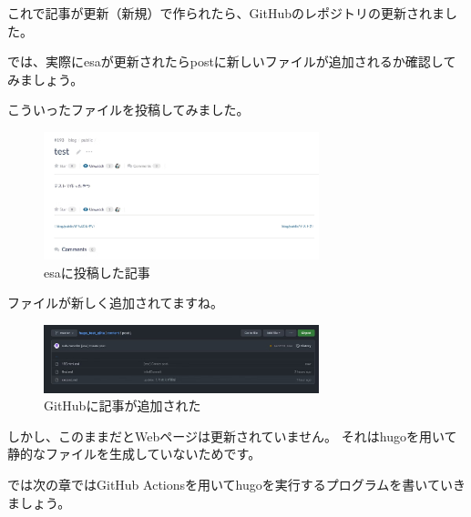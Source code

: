   これで記事が更新（新規）で作られたら、GitHubのレポジトリの更新されました。

  では、実際にesaが更新されたらpostに新しいファイルが追加されるか確認してみましょう。

  こういったファイルを投稿してみました。

  \begin{figure}[H]
    \centering
    \includegraphics[width=8cm]{./image/02-chap7/esa-posted.png}
    \caption{esaに投稿した記事 }
    \label{chap7-esa-posted-image}
  \end{figure}

  ファイルが新しく追加されてますね。

  \begin{figure}[H]
    \centering
    \includegraphics[width=8cm]{./image/02-chap7/github-upload-image.png}
    \caption{GitHubに記事が追加された }
    \label{chap7-github-upload-image-image}
  \end{figure}

  しかし、このままだとWebページは更新されていません。
  それはhugoを用いて静的なファイルを生成していないためです。

  では次の章ではGitHub Actionsを用いてhugoを実行するプログラムを書いていきましょう。




  
  
  